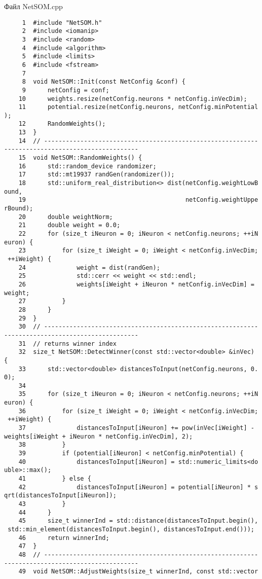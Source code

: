 Файл NetSOM.cpp
\begin{verbatim}
     1  #include "NetSOM.h"
     2  #include <iomanip>
     3  #include <random>
     4  #include <algorithm>
     5  #include <limits>
     6  #include <fstream>
     7
     8  void NetSOM::Init(const NetConfig &conf) {
     9      netConfig = conf;
    10      weights.resize(netConfig.neurons * netConfig.inVecDim);
    11      potential.resize(netConfig.neurons, netConfig.minPotential
);
    12      RandomWeights();
    13  }
    14  // -----------------------------------------------------------
-------------------------------------
    15  void NetSOM::RandomWeights() {
    16      std::random_device randomizer;
    17      std::mt19937 randGen(randomizer());
    18      std::uniform_real_distribution<> dist(netConfig.weightLowB
ound, 
    19                                            netConfig.weightUppe
rBound);
    20      double weightNorm;
    21      double weight = 0.0;
    22      for (size_t iNeuron = 0; iNeuron < netConfig.neurons; ++iN
euron) {
    23          for (size_t iWeight = 0; iWeight < netConfig.inVecDim;
 ++iWeight) {
    24              weight = dist(randGen);
    25              std::cerr << weight << std::endl;
    26              weights[iWeight + iNeuron * netConfig.inVecDim] = 
weight;
    27          }
    28      }
    29  }
    30  // -----------------------------------------------------------
-------------------------------------
    31  // returns winner index
    32  size_t NetSOM::DetectWinner(const std::vector<double> &inVec) 
{
    33      std::vector<double> distancesToInput(netConfig.neurons, 0.
0);
    34      
    35      for (size_t iNeuron = 0; iNeuron < netConfig.neurons; ++iN
euron) {
    36          for (size_t iWeight = 0; iWeight < netConfig.inVecDim;
 ++iWeight) {
    37              distancesToInput[iNeuron] += pow(inVec[iWeight] - 
weights[iWeight + iNeuron * netConfig.inVecDim], 2);        
    38          }
    39          if (potential[iNeuron] < netConfig.minPotential) {
    40              distancesToInput[iNeuron] = std::numeric_limits<do
uble>::max();
    41          } else {
    42              distancesToInput[iNeuron] = potential[iNeuron] * s
qrt(distancesToInput[iNeuron]);
    43          }
    44      }
    45      size_t winnerInd = std::distance(distancesToInput.begin(),
 std::min_element(distancesToInput.begin(), distancesToInput.end()));
    46      return winnerInd;
    47  }
    48  // -----------------------------------------------------------
-------------------------------------
    49  void NetSOM::AdjustWeights(size_t winnerInd, const std::vector

\end{verbatim}

